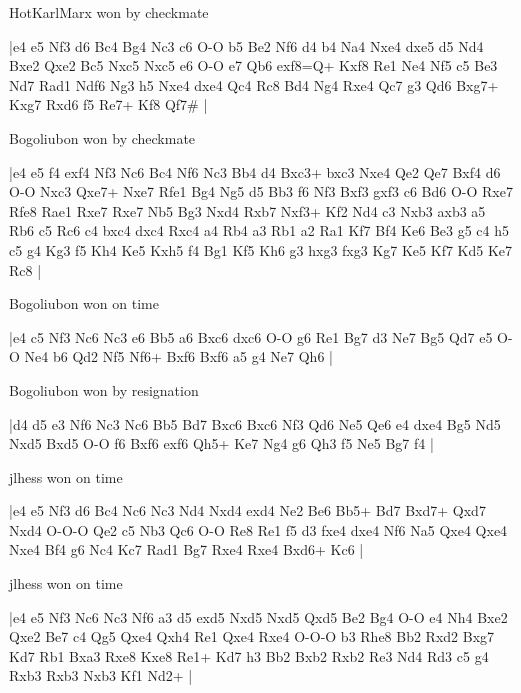 \showboard

HotKarlMarx won by checkmate

\makegametitle
|e4 e5 Nf3 d6 Bc4 Bg4 Nc3 c6 O-O b5 Be2 Nf6 d4 b4 Na4 Nxe4 dxe5 d5 Nd4 Bxe2 Qxe2 Bc5 Nxc5 Nxc5 e6 O-O e7 Qb6 exf8=Q+ Kxf8 Re1 Ne4 Nf5 c5 Be3 Nd7 Rad1 Ndf6 Ng3 h5 Nxe4 dxe4 Qc4 Rc8 Bd4 Ng4 Rxe4 Qc7 g3 Qd6 Bxg7+ Kxg7 Rxd6 f5 Re7+ Kf8 Qf7\#  |

\showboard

Bogoliubon won by checkmate

\makegametitle
|e4 e5 f4 exf4 Nf3 Nc6 Bc4 Nf6 Nc3 Bb4 d4 Bxc3+ bxc3 Nxe4 Qe2 Qe7 Bxf4 d6 O-O Nxc3 Qxe7+ Nxe7 Rfe1 Bg4 Ng5 d5 Bb3 f6 Nf3 Bxf3 gxf3 c6 Bd6 O-O Rxe7 Rfe8 Rae1 Rxe7 Rxe7 Nb5 Bg3 Nxd4 Rxb7 Nxf3+ Kf2 Nd4 c3 Nxb3 axb3 a5 Rb6 c5 Rc6 c4 bxc4 dxc4 Rxc4 a4 Rb4 a3 Rb1 a2 Ra1 Kf7 Bf4 Ke6 Be3 g5 c4 h5 c5 g4 Kg3 f5 Kh4 Ke5 Kxh5 f4 Bg1 Kf5 Kh6 g3 hxg3 fxg3 Kg7 Ke5 Kf7 Kd5 Ke7 Rc8  |

\showboard

Bogoliubon won on time

\makegametitle
|e4 c5 Nf3 Nc6 Nc3 e6 Bb5 a6 Bxc6 dxc6 O-O g6 Re1 Bg7 d3 Ne7 Bg5 Qd7 e5 O-O Ne4 b6 Qd2 Nf5 Nf6+ Bxf6 Bxf6 a5 g4 Ne7 Qh6  |

\showboard

Bogoliubon won by resignation

\makegametitle
|d4 d5 e3 Nf6 Nc3 Nc6 Bb5 Bd7 Bxc6 Bxc6 Nf3 Qd6 Ne5 Qe6 e4 dxe4 Bg5 Nd5 Nxd5 Bxd5 O-O f6 Bxf6 exf6 Qh5+ Ke7 Ng4 g6 Qh3 f5 Ne5 Bg7 f4  |

\showboard

jlhess won on time

\makegametitle
|e4 e5 Nf3 d6 Bc4 Nc6 Nc3 Nd4 Nxd4 exd4 Ne2 Be6 Bb5+ Bd7 Bxd7+ Qxd7 Nxd4 O-O-O Qe2 c5 Nb3 Qc6 O-O Re8 Re1 f5 d3 fxe4 dxe4 Nf6 Na5 Qxe4 Qxe4 Nxe4 Bf4 g6 Nc4 Kc7 Rad1 Bg7 Rxe4 Rxe4 Bxd6+ Kc6  |

\showboard

jlhess won on time

\makegametitle
|e4 e5 Nf3 Nc6 Nc3 Nf6 a3 d5 exd5 Nxd5 Nxd5 Qxd5 Be2 Bg4 O-O e4 Nh4 Bxe2 Qxe2 Be7 c4 Qg5 Qxe4 Qxh4 Re1 Qxe4 Rxe4 O-O-O b3 Rhe8 Bb2 Rxd2 Bxg7 Kd7 Rb1 Bxa3 Rxe8 Kxe8 Re1+ Kd7 h3 Bb2 Bxb2 Rxb2 Re3 Nd4 Rd3 c5 g4 Rxb3 Rxb3 Nxb3 Kf1 Nd2+  |

